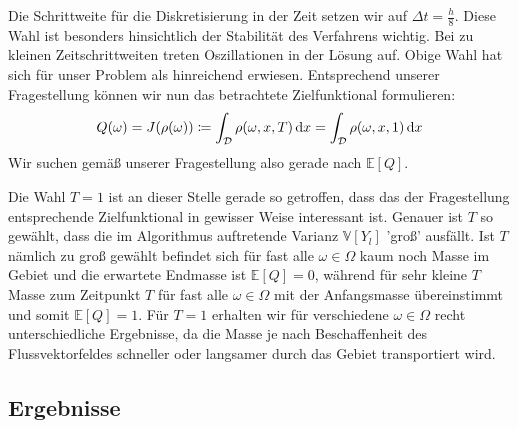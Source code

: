 Die Schrittweite für die Diskretisierung in der Zeit setzen wir auf $ \Delta t = \frac{h}{8} $. Diese Wahl ist besonders hinsichtlich der Stabilität des Verfahrens wichtig. Bei zu kleinen Zeitschrittweiten treten Oszillationen in der Lösung auf. Obige Wahl hat sich für unser Problem als hinreichend erwiesen.
Entsprechend unserer Fragestellung können wir nun das betrachtete Zielfunktional formulieren:
\[
Q(\omega) = J(\rho(\omega)) \coloneqq \int_{\mathcal{D}} \rho(\omega,x,T) \, \mathrm{d} x = \int_{\mathcal{D}} \rho(\omega,x,1) \, \mathrm{d} x
\]
Wir suchen gemäß unserer Fragestellung also gerade nach $ \mathbb{E}[Q] $.
\begin{Bemerkung2}\label{wahlfunk}
	Die Wahl $ T=1 $ ist an dieser Stelle gerade so getroffen, dass das der Fragestellung entsprechende Zielfunktional in gewisser Weise interessant ist. 
	Genauer ist $ T $ so gewählt, dass die im Algorithmus auftretende Varianz $ \mathbb{V}[Y_l] $ 'groß' ausfällt. Ist $ T $ nämlich zu groß gewählt befindet sich für fast alle $ \omega \in \Omega $ kaum noch Masse im Gebiet und die erwartete Endmasse ist $ \mathbb{E}[Q] = 0 $, während für sehr kleine $ T $ Masse zum Zeitpunkt $ T $ für fast alle $ \omega \in \Omega $ mit der Anfangsmasse übereinstimmt und somit $ \mathbb{E}[Q] = 1$. Für $ T = 1 $ erhalten wir für verschiedene $ \omega \in \Omega $ recht unterschiedliche Ergebnisse, da die Masse je nach Beschaffenheit des Flussvektorfeldes schneller oder langsamer durch das Gebiet transportiert wird. 
\end{Bemerkung2}

\subsection{Ergebnisse}


